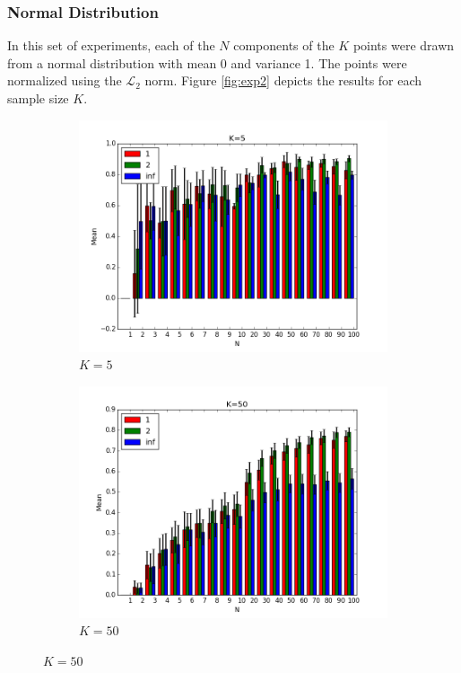 \documentclass{article}
\begin{document}
\subsubsection{Normal Distribution}
In this set of experiments, each of the $N$ components of the $K$ points were drawn from a normal distribution with mean 0 and variance 1. The points were normalized using the $\mathcal{L}_2$ norm. Figure \ref{fig:exp2} depicts the results for each sample size $K$.
\begin{figure}[H]
    \centering
    \begin{subfigure}[h]{0.45\textwidth}
        \includegraphics[width=\textwidth]{l-experiment2-5-inf.png}
        \caption{$K=5$}
        \label{fig:exp2k5}
    \end{subfigure}
   \begin{subfigure}[h]{0.45\textwidth}
        \includegraphics[width=\textwidth]{l-experiment2-50-inf.png}
        \caption{$K=50$}
        \label{fig:exp2k50}
    \end{subfigure}
   \centering
\end{figure}
\end{document}
